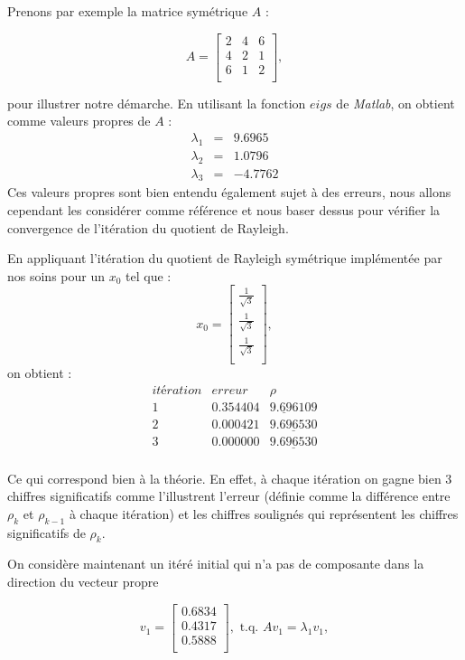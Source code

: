 Prenons par exemple la matrice symétrique $A$ : 

$$ A = \left[
\begin{array}{ccc}
  2 & 4 & 6  \\
  4 & 2 & 1 \\
  6 & 1 & 2 \\
\end{array}
\right],$$

pour illustrer notre démarche. En utilisant la fonction $eigs$ de \textit{Matlab}, on obtient comme valeurs propres de $A$ : 
   \begin{eqnarray} \label{valPropre1}
   \lambda_1 &=& 9.6965\\\label{valPropre2}
   \lambda_2 &=& 1.0796 \\\label{valPropre3}
   \lambda_3 &=& -4.7762
   \end{eqnarray}
Ces valeurs propres sont bien entendu également sujet à des erreurs, nous allons cependant les considérer comme référence et nous baser dessus pour vérifier la convergence de l'itération du quotient de Rayleigh.

En appliquant l'itération du quotient de Rayleigh symétrique implémentée par nos soins pour un $x_0$ tel que : 
$$ x_0 = \left[
\begin{array}{c}
  \frac{1}{\sqrt{3}}  \\
  \frac{1}{\sqrt{3}} \\
  \frac{1}{\sqrt{3}} \\
\end{array}
\right],$$
 on obtient : 
$$\begin{array}{ccc}
  itération & erreur & \rho  \\
  1 &   0.354404   &  \underline{9.696}109\\
  2 &  0.000421  & \underline{9.696530} \\
  3 &  0.000000  & \underline{9.696530} \\
\end{array}$$

Ce qui correspond bien à la théorie. En effet, à chaque itération on gagne bien 3 chiffres significatifs comme l'illustrent l'erreur (définie comme la différence entre $\rho_k$ et $\rho_{k-1}$ à chaque itération) et les chiffres soulignés qui représentent les chiffres significatifs de $\rho_k$.

On considère maintenant un itéré initial qui n'a pas de composante dans la direction du vecteur propre  

$$ v_1 = \left[
\begin{array}{c}
  0.6834  \\
   0.4317 \\
   0.5888 \\
\end{array}
\right], \text{ t.q. } Av_1 = \lambda_1 v_1,$$

